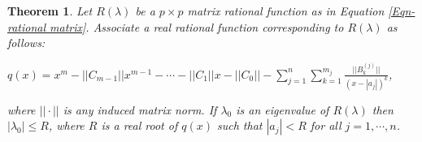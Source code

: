 \documentclass[12pt, reqno]{amsart}
\newtheorem{theorem}{Theorem}[section]
\theoremstyle{definition}
\theoremstyle{remark}
\numberwithin{equation}{section}
\begin{document}

\medskip

\begin{theorem}\label{Thm-eigenvalue bounds-matrix rational function}
Let $R(\lambda)$ be a $p \times p$ matrix rational function as in Equation \eqref{Eqn- rational matrix}. 
Associate a real rational function corresponding to $R(\lambda)$ as follows:
\begin{center}
$q(x) = x^m-||C_{m-1}||x^{m-1}-\cdots - ||C_1|| x - ||C_0|| - \displaystyle 
\sum_{j=1}^{n} \sum_{k=1}^{m_j} \frac{||B_k^{(j)}||}{(x- |a_j|)^k}$,
\end{center}
where $||\cdot ||$ is any induced matrix norm. If $\lambda_0$ is an eigenvalue of 
$R(\lambda)$ then $|\lambda_0| \leq R$, where $R$ is a real root of $q(x)$ such that 
$|a_j| < R$ for all $j=1,\cdots,n$.
\end{theorem}
\end{document}
